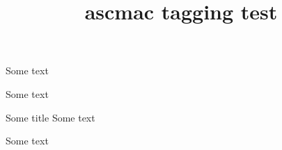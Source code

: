 \documentclass{article}
\title{ascmac tagging test}
\begin{document}
\begin{boxnote}
Some text
\end{boxnote}

\begin{screen}
Some text
\end{screen}

\begin{itembox}{Some title}
Some text
\end{itembox}

\begin{shadebox}
Some text
\end{shadebox}





\yen

\return

\Return

\ascii

\Ascii

\ASCII
\end{document}

